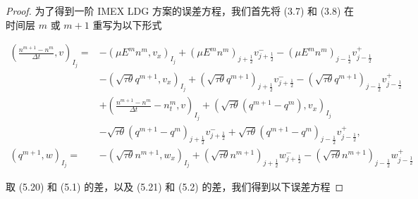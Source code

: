 \begin{proof}
    为了得到一阶 IMEX LDG 方案的误差方程，我们首先将 (3.7) 和 (3.8) 在时间层 $m$ 或 $m+1$ 重写为以下形式

    $$
        \begin{aligned}
            \left(\frac{n^{m+1}-n^{m}}{\Delta t}, v\right)_{I_{j}}= & -\left(\mu E^{m} n^{m}, v_{x}\right)_{I_{j}}+\left(\mu E^{m} n^{m}\right)_{j+\frac{1}{2}} v_{j+\frac{1}{2}}^{-}-\left(\mu E^{m} n^{m}\right)_{j-\frac{1}{2}} v_{j-\frac{1}{2}}^{+}                                  \\
                                                                    & -\left(\sqrt{\tau \theta} q^{m+1}, v_{x}\right)_{I_{j}}+\left(\sqrt{\tau \theta} q^{m+1}\right)_{j+\frac{1}{2}} v_{j+\frac{1}{2}}^{-}-\left(\sqrt{\tau \theta} q^{m+1}\right)_{j-\frac{1}{2}} v_{j-\frac{1}{2}}^{+} \\
                                                                    & +\left(\frac{n^{m+1}-n^{m}}{\Delta t}-n_{t}^{m}, v\right)_{I_{j}}+\left(\sqrt{\tau \theta}\left(q^{m+1}-q^{m}\right), v_{x}\right)_{I_{j}}                                                                          \\
                                                                    & -\sqrt{\tau \theta}\left(q^{m+1}-q^{m}\right)_{j+\frac{1}{2}} v_{j+\frac{1}{2}}^{-}+\sqrt{\tau \theta}\left(q^{m+1}-q^{m}\right)_{j-\frac{1}{2}} v_{j-\frac{1}{2}}^{+},                                             \\
            \left(q^{m+1}, w\right)_{I_{j}}=                        & -\left(\sqrt{\tau \theta} n^{m+1}, w_{x}\right)_{I_{j}}+\left(\sqrt{\tau \theta} n^{m+1}\right)_{j+\frac{1}{2}} w_{j+\frac{1}{2}}^{-}-\left(\sqrt{\tau \theta} n^{m+1}\right)_{j-\frac{1}{2}} w_{j-\frac{1}{2}}^{+}
        \end{aligned}
    $$

    取 (5.20) 和 (5.1) 的差，以及 (5.21) 和 (5.2) 的差，我们得到以下误差方程


\end{proof}
